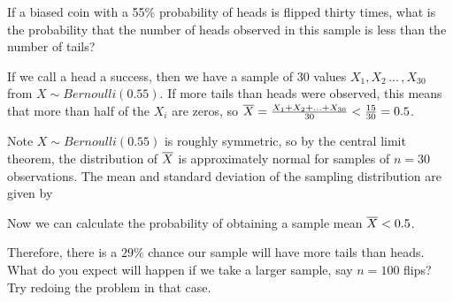 \begin{examp}
If a biased coin with a 55\% probability of heads is flipped thirty times, what is the probability that the number of heads observed in this sample is less than the number of tails?
\par
\noindent If we call a head a success, then we have a sample of 30 values $X_1,X_2\,...\,,X_{30}$ from $X \sim Bernoulli(0.55)$. If more tails than heads were observed, this means that more than half of the $X_i$ are zeros, so ${\overline{X}} = \frac{X_1 + X_2 + ... + X_{30}}{30} < \frac{15}{30} =0.5$.
\par
\noindent Note $X \sim Bernoulli(0.55)$ is roughly symmetric, so by the central limit theorem, the distribution of ${\overline{X}}$ is approximately normal for samples of $n = 30$ observations. The mean and standard deviation of the sampling distribution are given by 
\par
\noindent Now we can calculate the probability of obtaining a sample mean ${\overline{X}} < 0.5$.


\begin{center}
    \begin{minipage}{.5\textwidth}
        \centering
  \vspace{1.25em}
    \end{minipage}%
    \begin{minipage}{0.5\textwidth}
        \centering
\end{minipage}
\end{center}
Therefore, there is a $29\%$ chance our sample will have more tails than heads. What do you expect will happen if we take a larger sample, say $n=100$ flips? Try redoing the problem in that case.
\end{examp}

